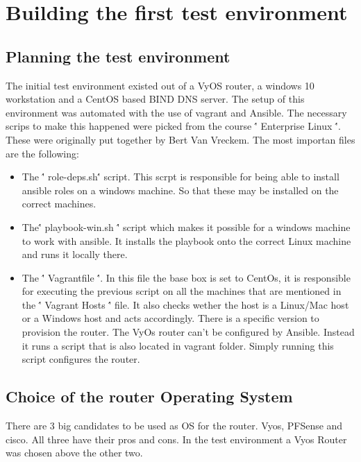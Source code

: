 

\chapter{Building the first test environment}
\label{ch:TestEnvironment1}

\section{Planning the test environment}
The initial test environment existed out of a VyOS router, a windows 10 workstation and a CentOS based BIND DNS server. The setup of this environment was automated with the use of vagrant and Ansible. The necessary scrips to make this happened were picked from the course \'' Enterprise Linux \''. These were originally put together by Bert Van Vreckem. The most importan files are the following:
\begin{itemize}
\item The \'' role-deps.sh\'' script. This scrpt is responsible for being able to install ansible roles on a windows machine. So that these may be installed on the correct machines.
\item The\'' playbook-win.sh \'' script which makes it possible for a windows machine to work with ansible. It installs the playbook onto the correct Linux machine and runs it locally there.
\item The \'' Vagrantfile \''. In this file the base box is set to CentOs, it is responsible for executing the previous script on all the machines that are mentioned in the \'' Vagrant Hosts \'' file. It also checks wether the host is a Linux/Mac host or a Windows host and acts accordingly. There is a specific version to provision the router. The VyOs router can't be configured by Ansible. Instead it runs a script that is also located in vagrant folder. Simply running this script configures the router.
\end {itemize}

\section{ Choice of the router Operating System }
There are 3 big candidates to be used as OS for the router. Vyos, PFSense and cisco. All three have their pros and cons. In the test environment a Vyos Router was chosen above the other two.
